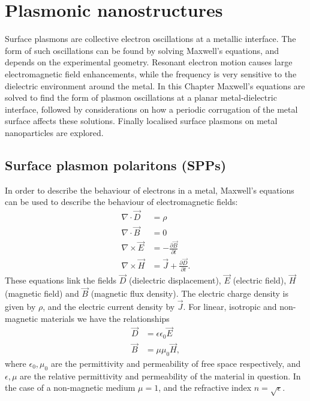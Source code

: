 
\chapter{Plasmonic nanostructures}

\graphicspath{{Chapter3/Figures/}}

Surface plasmons are collective electron oscillations at a metallic interface. The form of such oscillations can be found by solving Maxwell's equations, and depends on the experimental geometry. Resonant electron motion causes large electromagnetic field enhancements, while the frequency is very sensitive to the dielectric environment around the metal. In this Chapter Maxwell's equations are solved to find the form of plasmon oscillations at a planar metal-dielectric interface, followed by considerations on how a periodic corrugation of the metal surface affects these solutions. Finally localised surface plasmons on	metal nanoparticles are explored.

\section{Surface plasmon polaritons (SPPs)}
In order to describe the behaviour of electrons in a metal, Maxwell's equations can be used to describe the behaviour of electromagnetic fields:
\begin{subequations}
\label{Maxwell}
\begin{align}
\nabla \cdot \vec{D} &= \rho \label{Maxwell1}\\
\nabla \cdot \vec{B} &= 0 \label{Maxwell2}\\
\nabla \times \vec{E} &= - \frac{\partial \vec{B}}{\partial t} \label{Maxwell3}\\
\nabla \times \vec{H} &= \vec{J} + \frac{\partial \vec{D}}{\partial t} \label{Maxwell4}. 
\end{align}
\end{subequations}
These equations link the fields $\vec{D}$ (dielectric displacement), $\vec{E}$ (electric field), $\vec{H}$ (magnetic field) and $\vec{B}$ (magnetic flux density). The electric charge density is given by $\rho$, and the electric current density by $\vec{J}$. For linear, isotropic and non-magnetic materials we have the relationships
\begin{subequations}
\label{fieldrelations}
\begin{align}
\vec{D} &= \epsilon \epsilon_0 \vec{E} \label{DE}\\
\vec{B} &= \mu \mu_0 \vec{H} \label{BH},
\end{align}
\end{subequations}
where $\epsilon_0, \mu_0$ are the permittivity and permeability of free space respectively, and $\epsilon, \mu$ are the relative permittivity and permeability of the material in question. In the case of a non-magnetic medium $\mu=1$, and the refractive index $n=\sqrt{\epsilon}$.

